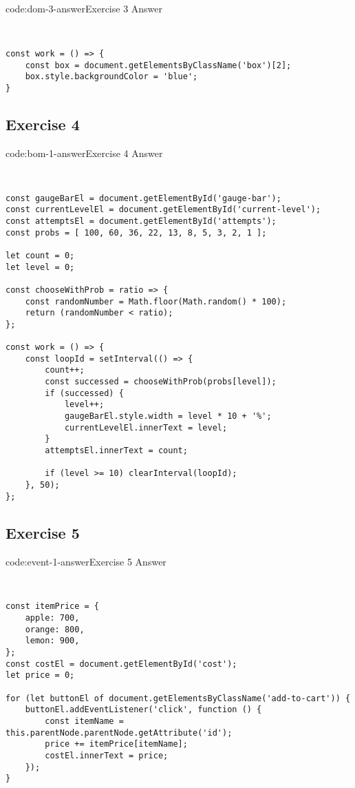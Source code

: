 \begin{codeenv}{code:dom-3-answer}{Exercise 3 Answer}\begin{verbatim}


const work = () => {
    const box = document.getElementsByClassName('box')[2];
    box.style.backgroundColor = 'blue';
}
\end{verbatim}
\end{codeenv}
\pagebreak

\subsection*{Exercise 4}

\begin{codeenv}{code:bom-1-answer}{Exercise 4 Answer}\begin{verbatim}


const gaugeBarEl = document.getElementById('gauge-bar');
const currentLevelEl = document.getElementById('current-level');
const attemptsEl = document.getElementById('attempts');
const probs = [ 100, 60, 36, 22, 13, 8, 5, 3, 2, 1 ];

let count = 0;
let level = 0;

const chooseWithProb = ratio => {
    const randomNumber = Math.floor(Math.random() * 100);
    return (randomNumber < ratio);
};

const work = () => {
    const loopId = setInterval(() => {
        count++;
        const successed = chooseWithProb(probs[level]);
        if (successed) {
            level++;
            gaugeBarEl.style.width = level * 10 + '%';
            currentLevelEl.innerText = level;
        }
        attemptsEl.innerText = count;

        if (level >= 10) clearInterval(loopId);
    }, 50);
};
\end{verbatim}
\end{codeenv}

\subsection*{Exercise 5}

\begin{codeenv}{code:event-1-answer}{Exercise 5 Answer}\begin{verbatim}


const itemPrice = {
    apple: 700, 
    orange: 800, 
    lemon: 900, 
};
const costEl = document.getElementById('cost');
let price = 0;

for (let buttonEl of document.getElementsByClassName('add-to-cart')) {
    buttonEl.addEventListener('click', function () {
        const itemName = this.parentNode.parentNode.getAttribute('id');
        price += itemPrice[itemName];
        costEl.innerText = price;
    });
}
\end{verbatim}
\end{codeenv}
\pagebreak

